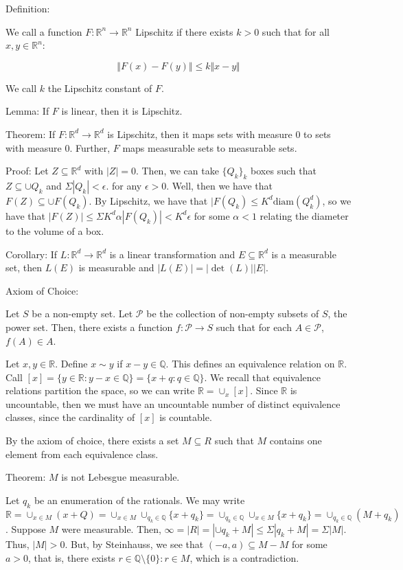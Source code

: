 \documentclass[10pt]{article}
\begin{document}
Definition:

We call a function $F: \mathbb{R}^n \to \mathbb{R}^n$ Lipschitz if there exists $k > 0$  such that for all $x,y \in \mathbb{R}^n$:

$$ \Vert F(x) - F(y) \Vert \leq k \Vert x - y \Vert $$

We call $k$ the Lipschitz constant of $F$. 

Lemma: If $F$ is linear, then it is Lipschitz.

Theorem: If $F: \mathbb{R}^d \to \mathbb{R}^d$ is Lipschitz, then it maps sets with measure 0 to sets with measure 0. Further, $F$ maps measurable sets to measurable sets.

Proof: Let $Z \subseteq \mathbb{R}^d$ with $|Z| = 0$. Then, we can take $\{ Q_k \}_k$ boxes such that $Z \subseteq \cup Q_k$ and $\Sigma |Q_k| < \epsilon$. for any $\epsilon > 0$. Well, then we have that $F(Z) \subseteq \cup F(Q_k)$. By Lipschitz, we have that $|F(Q_k ) \leq K ^d \text{diam}(Q_k^d)$, so we have that $|F(Z)| \leq \Sigma K^d \alpha |F(Q_k)| < K^d  \epsilon$ for some $\alpha < 1$ relating the diameter to the volume of a box.

Corollary: If $L: \mathbb{R}^d \to \mathbb{R}^d$ is a linear transformation and $E \subseteq \mathbb{R}^d$ is a measurable set, then $L(E)$ is measurable and $|L(E)|= |\det(L)| |E|$.

Axiom of Choice:

Let $S$ be a non-empty set. Let $\mathcal{P}$ be the collection of non-empty subsets of $S$, the power set. Then, there exists a function $f: \mathcal{P} \to S$ such that for each $A \in \mathcal{P}$, $f(A) \in A$.

Let $x,y \in \mathbb{R}$. Define $x \sim y$ if $x -y \in \mathbb{Q}$. This defines an equivalence relation on $\mathbb{R}$. Call $[x] = \{ y \in \mathbb{R} : y - x \in \mathbb{Q} \} = \{ x + q : q \in \mathbb{Q} \} $. We recall that equivalence relations partition the space, so we can write $\mathbb{R} = \cup_x [x]$. Since $\mathbb{R}$ is uncountable, then we must have an uncountable number of distinct equivalence classes, since the cardinality of $[x]$ is countable.

By the axiom of choice, there exists a set $M \subseteq R$ such that $M$ contains one element from each equivalence class.

Theorem: $M$ is not Lebesgue measurable.

Let $q_k$ be an enumeration of the rationals. We may write $\mathbb{R} = \cup_{x \in M} (x + Q) = \cup_{x \in M} \cup_{q_k \in \mathbb{Q}} \{ x + q_k \} = \cup_{q_k \in \mathbb{Q}}  \cup_{x \in M} \{ x + q_k \}  = \cup_{q_k \in \mathbb{Q}} (M + q_k)$. Suppose $M$ were measurable. Then, $\infty = |R| = |\cup q_k + M| \leq \Sigma |q_k + M| = \Sigma |M|$. Thus, $ |M| > 0$. But, by Steinhauss, we see that $(-a,a) \subseteq M - M$ for some $a > 0$, that is, there exists $r \in \mathbb{Q} \setminus \{ 0 \} : r \in M$, which is a contradiction.
\end{document}
